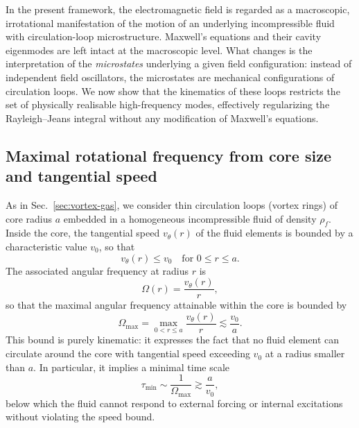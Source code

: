 \documentclass[11pt]{article}
\begin{document}
        In the present framework, the electromagnetic field is regarded as a macroscopic,
        irrotational manifestation of the motion of an underlying incompressible fluid with
        circulation-loop microstructure. Maxwell's equations and their cavity eigenmodes are
        left intact at the macroscopic level. What changes is the interpretation of the
        \emph{microstates} underlying a given field configuration: instead of independent
        field oscillators, the microstates are mechanical configurations of circulation loops.
        We now show that the kinematics of these loops restricts the set of physically
        realisable high-frequency modes, effectively regularizing the Rayleigh--Jeans
        integral without any modification of Maxwell's equations.

        \subsection{Maximal rotational frequency from core size and tangential speed}

            As in Sec.~\ref{sec:vortex-gas}, we consider thin circulation loops (vortex rings)
            of core radius $a$ embedded in a homogeneous incompressible fluid of density $\rho_f$.
            Inside the core, the tangential speed $v_\theta(r)$ of the fluid elements is bounded
            by a characteristic value $v_0$, so that
            \begin{equation}
                v_\theta(r) \leq v_0 \quad \text{for } 0 \leq r \leq a.
            \end{equation}
            The associated angular frequency at radius $r$ is
            \begin{equation}
                \Omega(r) = \frac{v_\theta(r)}{r},
            \end{equation}
            so that the maximal angular frequency attainable within the core is bounded by
            \begin{equation}
                \Omega_{\max}
                = \max_{0<r\leq a} \frac{v_\theta(r)}{r}
                \lesssim \frac{v_0}{a}.
                \label{eq:Omega-max}
            \end{equation}
            This bound is purely kinematic: it expresses the fact that no fluid element can
            circulate around the core with tangential speed exceeding $v_0$ at a radius smaller
            than $a$. In particular, it implies a minimal time scale
            \begin{equation}
                \tau_{\min} \sim \frac{1}{\Omega_{\max}} \gtrsim \frac{a}{v_0},
            \end{equation}
            below which the fluid cannot respond to external forcing or internal excitations
            without violating the speed bound.
\end{document}
